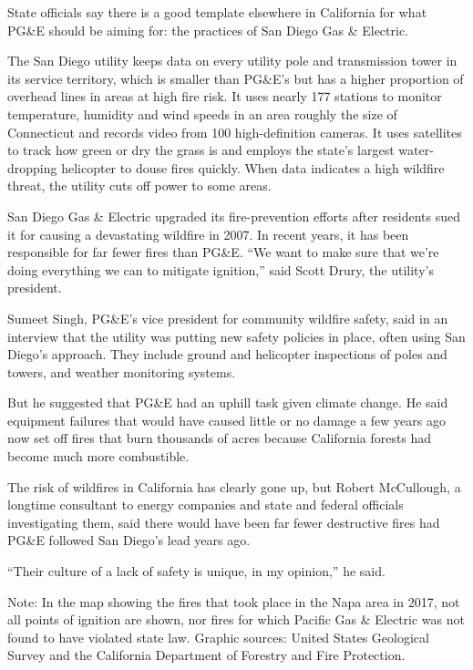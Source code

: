 State officials say there is a good template elsewhere in California for
what PG\&E should be aiming for: the practices of San Diego Gas \&
Electric.

The San Diego utility keeps data on every utility pole and transmission
tower in its service territory, which is smaller than PG\&E's but has a
higher proportion of overhead lines in areas at high fire risk. It uses
nearly 177 stations to monitor temperature, humidity and wind speeds in
an area roughly the size of Connecticut and records video from 100
high-definition cameras. It uses satellites to track how green or dry
the grass is and employs the state's largest water-dropping helicopter
to douse fires quickly. When data indicates a high wildfire threat, the
utility cuts off power to some areas.

San Diego Gas \& Electric upgraded its fire-prevention efforts after
residents sued it for causing a devastating wildfire in 2007. In recent
years, it has been responsible for far fewer fires than PG\&E. ``We want
to make sure that we're doing everything we can to mitigate ignition,''
said Scott Drury, the utility's president.

Sumeet Singh, PG\&E's vice president for community wildfire safety, said
in an interview that the utility was putting new safety policies in
place, often using San Diego's approach. They include ground and
helicopter inspections of poles and towers, and weather monitoring
systems.

But he suggested that PG\&E had an uphill task given climate change. He
said equipment failures that would have caused little or no damage a few
years ago now set off fires that burn thousands of acres because
California forests had become much more combustible.

The risk of wildfires in California has clearly gone up, but Robert
McCullough, a longtime consultant to energy companies and state and
federal officials investigating them, said there would have been far
fewer destructive fires had PG\&E followed San Diego's lead years ago.

``Their culture of a lack of safety is unique, in my opinion,'' he said.

Note: In the map showing the fires that took place in the Napa area in
2017, not all points of ignition are shown, nor fires for which Pacific
Gas \& Electric was not found to have violated state law. \textbar{}
Graphic sources: United States Geological Survey and the California
Department of Forestry and Fire Protection.


